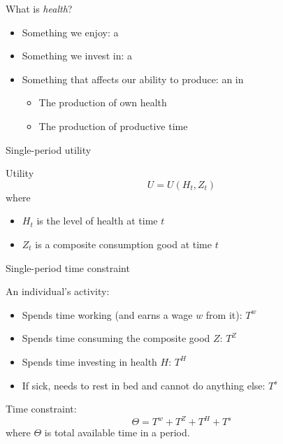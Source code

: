 \begin{frame}{What is \textit{health}?}

    \begin{itemize}
        \item Something we enjoy: a 
        \pause
        \item Something we invest in: a 
        \pause
        \item Something that affects our ability to produce: an  in
        \begin{itemize}
            \item The production of own health
            \item The production of productive time
        \end{itemize}

    \end{itemize}
\end{frame}
\begin{frame}{Single-period utility}

    Utility
    \begin{equation*}
        U = U\left( H_t, Z_t \right)
    \end{equation*}
    where
    \begin{itemize}
        \item $H_t$ is the level of health at time $t$
        \item $Z_t$ is a composite consumption good at time $t$
    \end{itemize}


\end{frame}
\begin{frame}{Single-period time constraint}

    An individual's activity:
    \begin{itemize}
        \item Spends time working (and earns a wage $w$ from it): $T^w$
        \item Spends time consuming the composite good $Z$: $T^Z$
        \item Spends time investing in health $H$: $T^H$
        \item If sick, needs to rest in bed and cannot do anything else: $T^s$
    \end{itemize}
    \vspace{3mm}

    Time constraint:
    \begin{equation*}
        \Theta = T^w + T^Z + T^H + T^s
    \end{equation*}
    where $\Theta$ is total available time in a period.

\end{frame}
